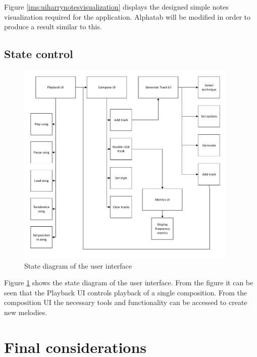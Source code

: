 Figure \ref{ims:uiharrynotesvisualization} displays the designed simple notes visualization required for the application. Alphatab will be modified in order to produce a result similar to this.





\section{State control}

\begin{figure}
\centerline{\includegraphics[width=400px]{../images/ui_control_blockdiagram.pdf}}
\caption{State diagram of the user interface}
\label{ims:uiflow}
\end{figure}

Figure \ref{ims:uiflow} shows the state diagram of the user interface. 
From the figure it can be seen that the Playback UI controls playback of a single composition. From the composition UI the necessary tools and functionality can be accessed to create new melodies.


\chapter{Final considerations}